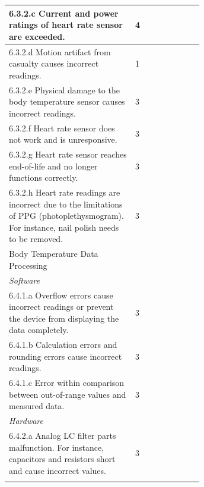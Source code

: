 \documentclass{article}
\begin{document}
\begin{longtable}{|p{0.65\linewidth}|l|}
\hline
6.3.2.c Current and power ratings of heart rate sensor are exceeded.                                                                                               & 4                   \\
\hline
6.3.2.d Motion artifact from casualty causes incorrect readings. & 1                   \\
\hline
6.3.2.e Physical damage to the body temperature sensor causes incorrect readings.                                                                                  & 3                   \\
\hline
6.3.2.f Heart rate sensor does not work and is unresponsive.     & 3                   \\
\hline
6.3.2.g Heart rate sensor reaches end-of-life and no longer functions correctly.                                                                                   & 3                   \\
\hline
6.3.2.h Heart rate readings are incorrect due to the limitations of PPG (photoplethysmogram). For
instance, nail polish needs to be removed.                       & 3                   \\
\hline 
\rowcolor{Gray}
Body Temperature Data Processing                                   &                     \\
\hline
\textit{Software}                                                  &                     \\
\hline
6.4.1.a Overflow errors cause incorrect readings or prevent the device from displaying the data completely.                                                      & 3                   \\
\hline
6.4.1.b Calculation errors and rounding errors cause incorrect readings.                                                                                           & 3                   \\
\hline
6.4.1.c Error within comparison between out-of-range values and measured data.                                                                                     & 3                   \\
\hline
\textit{Hardware}                                                  &                     \\
\hline
6.4.2.a Analog LC filter parts malfunction. For instance, capacitors and resistors short and cause
incorrect values.                                                & 3                   \\
\hline    
\rowcolor{Gray}

\end{longtable}
\end{document}
